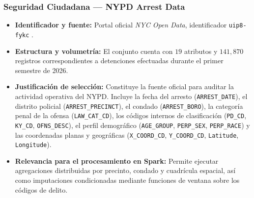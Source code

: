 \documentclass[11pt,a4paper]{article}
\begin{document}
\subsubsection{Seguridad Ciudadana --- NYPD Arrest Data}
\begin{itemize}
    \item \textbf{Identificador y fuente:} Portal oficial \textit{NYC Open Data}, identificador \texttt{uip8-fykc} \cite{nypd_arrests_ytd_2026}.
    \item \textbf{Estructura y volumetría:} El conjunto cuenta con $19$ atributos y $141,870$ registros correspondientes a detenciones efectuadas durante el primer semestre de 2026.
    \item \textbf{Justificación de selección:} Constituye la fuente oficial para auditar la actividad operativa del NYPD. Incluye la fecha del arresto (\texttt{ARREST\_DATE}), el distrito policial (\texttt{ARREST\_PRECINCT}), el condado (\texttt{ARREST\_BORO}), la categoría penal de la ofensa (\texttt{LAW\_CAT\_CD}), los códigos internos de clasificación (\texttt{PD\_CD}, \texttt{KY\_CD}, \texttt{OFNS\_DESC}), el perfil demográfico (\texttt{AGE\_GROUP}, \texttt{PERP\_SEX}, \texttt{PERP\_RACE}) y las coordenadas planas y geográficas (\texttt{X\_COORD\_CD}, \texttt{Y\_COORD\_CD}, \texttt{Latitude}, \texttt{Longitude}).
    \item \textbf{Relevancia para el procesamiento en Spark:} Permite ejecutar agregaciones distribuidas por precinto, condado y cuadrícula espacial, así como imputaciones condicionadas mediante funciones de ventana sobre los códigos de delito.
\end{itemize}
\end{document}
